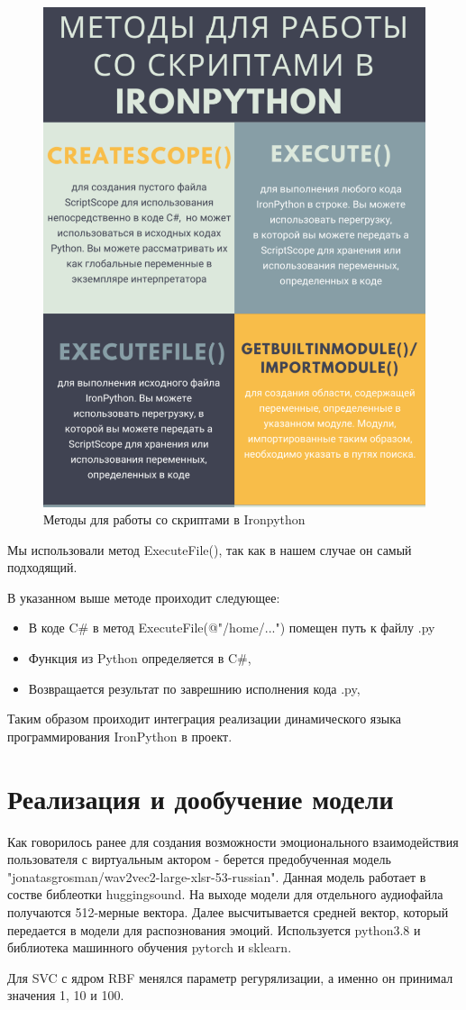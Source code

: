 \begin{figure}[!h]
\includegraphics[width=0.40\columnwidth]{./img/ironpy.png}
\centering
\caption{Методы для работы со скриптами в Ironpython}
\label{pic:ironpy}
\end{figure}

Мы использовали метод ExecuteFile(), так как в нашем случае он самый подходящий.

В указанном выше методе проиходит следующее:
\begin{itemize}
  \item В коде C\# в метод ExecuteFile(@"/home/...") помещен путь к файлу .py
  \item Функция из Python определяется в C\#,
  \item Возвращается результат по заврешнию исполнения кода .py,
\end{itemize}

Таким образом проиходит интеграция реализации динамического языка программирования IronPython в проект.


\section{Реализация и дообучение модели}

Как говорилось ранее для создания возможности эмоционального взаимодействия пользователя с виртуальным актором - 
берется предобученная модель "jonatasgrosman/wav2vec2-large-xlsr-53-russian". Данная модель 
работает в состве библеотки huggingsound. На выходе модели для отдельного аудиофайла получаются 512-мерные вектора. 
Далее высчитывается средней вектор, который передается в модели для распознования эмоций.
Используется python3.8 и библиотека машинного обучения pytorch и sklearn.

Для SVC с ядром RBF менялся параметр регурялизации, а именно он принимал значения 1, 10 и 100.


